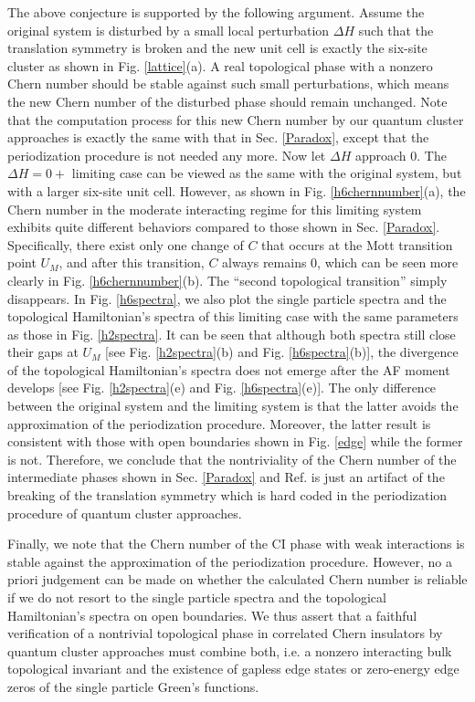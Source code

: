\documentclass[12pt]{iopart}
\begin{document}
\par The above conjecture is supported by the following argument. Assume the original system is disturbed by a small local perturbation $\Delta H$ such that the translation symmetry is broken and the new unit cell is exactly the six-site cluster as shown in Fig. \ref{lattice}(a). A real topological phase with a nonzero Chern number should be stable against such small perturbations, which means the new Chern number of the disturbed phase should remain unchanged. Note that the computation process for this new Chern number by our quantum cluster approaches is exactly the same with that in Sec. \ref{Paradox}, except that the periodization procedure is not needed any more. Now let $\Delta H$ approach $0$. The $\Delta H=0+$ limiting case can be viewed as the same with the original system, but with a larger six-site unit cell. However, as shown in Fig. \ref{h6chernnumber}(a), the Chern number in the moderate interacting regime for this limiting system exhibits quite different behaviors compared to those shown in Sec. \ref{Paradox}. Specifically, there exist only one change of $C$ that occurs at the Mott transition point $U_M$, and after this transition, $C$ always remains $0$, which can be seen more clearly in Fig. \ref{h6chernnumber}(b). The ``second topological transition'' simply disappears. In Fig. \ref{h6spectra}, we also plot the single particle spectra and the topological Hamiltonian's spectra of this limiting case with the same parameters as those in Fig. \ref{h2spectra}. It can be seen that although both spectra still close their gaps at $U_M$ [see Fig. \ref{h2spectra}(b) and Fig. \ref{h6spectra}(b)], the divergence of the topological Hamiltonian's spectra does not emerge after the AF moment develops [see Fig. \ref{h2spectra}(e) and Fig. \ref{h6spectra}(e)]. The only difference between the original system and the limiting system is that the latter avoids the approximation of the periodization procedure. Moreover, the latter result is consistent with those with open boundaries shown in Fig. \ref{edge} while the former is not. Therefore, we conclude that the nontriviality of the Chern number of the intermediate phases shown in Sec. \ref{Paradox} and Ref. \cite{WFSM_PRB2016} is just an artifact of the breaking of the translation symmetry which is hard coded in the periodization procedure of quantum cluster approaches.

\par Finally, we note that the Chern number of the CI phase with weak interactions is stable against the approximation of the periodization procedure. However, no a priori judgement can be made on whether the calculated Chern number is reliable if we do not resort to the single particle spectra and the topological Hamiltonian's spectra on open boundaries. We thus assert that a faithful verification of a nontrivial topological phase in correlated Chern insulators by quantum cluster approaches must combine both, i.e. a nonzero interacting bulk topological invariant and the existence of gapless edge states or zero-energy edge zeros of the single particle Green's functions.
\end{document}
